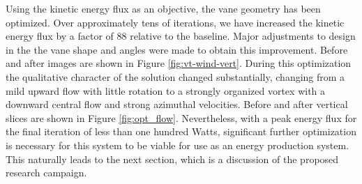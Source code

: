 

%
%
%

Using the kinetic energy flux as an objective, the vane geometry has
been optimized. Over approximately tens of iterations, we have
increased the kinetic energy flux by a factor of 88 relative to the
baseline. 
Major adjustments to design in the the vane
shape and angles were made to obtain this improvement. Before and after
images are shown in Figure \ref{fig:vt-wind-vert}. During this
optimization the 
qualitative character of the solution changed substantially, changing
from a mild upward flow with little rotation to a strongly organized
vortex with a downward central flow and strong azimuthal
velocities. Before and after vertical slices are shown in Figure
\ref{fig:opt_flow}. Nevertheless, with a peak energy flux for the final 
iteration of less than one hundred Watts, significant further
optimization is necessary for this system to be viable for use as an 
energy production system. This naturally leads to the next section,
which is a discussion of the proposed research campaign. 

